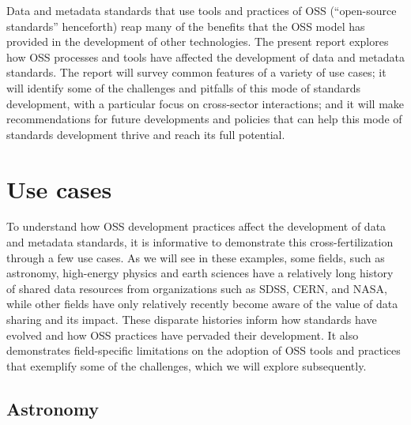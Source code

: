 \documentclass[
  letterpaper,
  DIV=11,
  numbers=noendperiod]{scrartcl}
\begin{document}
Data and metadata standards that use tools and practices of OSS
(``open-source standards'' henceforth) reap many of the benefits that
the OSS model has provided in the development of other technologies. The
present report explores how OSS processes and tools have affected the
development of data and metadata standards. The report will survey
common features of a variety of use cases; it will identify some of the
challenges and pitfalls of this mode of standards development, with a
particular focus on cross-sector interactions; and it will make
recommendations for future developments and policies that can help this
mode of standards development thrive and reach its full potential.

\section{Use cases}\label{sec-use-cases}

To understand how OSS development practices affect the development of
data and metadata standards, it is informative to demonstrate this
cross-fertilization through a few use cases. As we will see in these
examples, some fields, such as astronomy, high-energy physics and earth
sciences have a relatively long history of shared data resources from
organizations such as SDSS, CERN, and NASA, while other fields have only
relatively recently become aware of the value of data sharing and its
impact. These disparate histories inform how standards have evolved and
how OSS practices have pervaded their development. It also demonstrates
field-specific limitations on the adoption of OSS tools and practices
that exemplify some of the challenges, which we will explore
subsequently.

\subsection{Astronomy}\label{astronomy}
\end{document}
